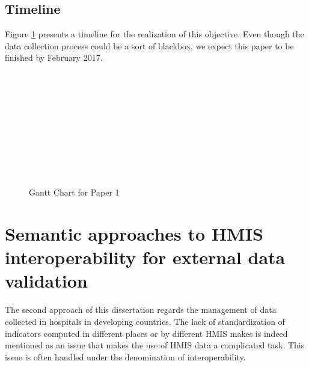 \documentclass[a4paper,11pt,draft,twoside]{article}
\begin{document}
\subsection{Timeline} Figure  \ref{GanttPaper1} presents a timeline for the realization of this objective. Even though the data collection process could be a sort of blackbox, we expect this paper to be finished by February 2017.

\begin{figure}[h]
\begin{ganttchart}{1}{24}
 \\
 \\
 \\
 \\
 \\
 \\
 \\
 \\
 \\
\end{ganttchart}
\caption{Gantt Chart for Paper 1}
\label{GanttPaper1}
\end{figure}

\newpage
\section{Semantic approaches to HMIS interoperability for external data validation}

The second approach of this dissertation regards the management of data collected in hospitals in developing countries. The lack of standardization of indicators computed in different places or by different HMIS makes is indeed mentioned as an issue that makes the use of HMIS data a complicated task. This issue is often handled under the denomination of interoperability.
\end{document}
